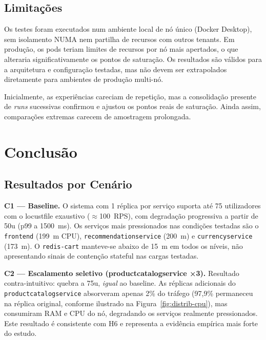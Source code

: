 \documentclass[manuscript,screen,review]{acmart}
\begin{document}
\subsection{Limitações}

Os testes foram executados num ambiente local de nó único (Docker Desktop), sem isolamento NUMA nem partilha de recursos com outros tenants. Em produção, os pods teriam limites de recursos por nó mais apertados, o que alteraria significativamente os pontos de saturação. Os resultados são válidos para a arquitetura e configuração testadas, mas não devem ser extrapolados diretamente para ambientes de produção multi-nó.

Inicialmente, as experiências careciam de repetição, mas a consolidação presente de \textit{runs} sucessivas confirmou e ajustou os pontos reais de saturação. Ainda assim, comparações extremas carecem de amostragem prolongada.

\section{Conclusão}

\subsection{Resultados por Cenário}

\textbf{C1 — Baseline.} O sistema com 1 réplica por serviço suporta até 75 utilizadores com o locustfile exaustivo ($\approx$100~RPS), com degradação progressiva a partir de 50u (p99 a 1500~ms). Os serviços mais pressionados nas condições testadas são o \texttt{frontend} (199~m CPU), \texttt{recommendationservice} (200~m) e \texttt{currencyservice} (173~m). O \texttt{redis-cart} manteve-se abaixo de 15~m em todos os níveis, não apresentando sinais de contenção stateful nas cargas testadas.

\textbf{C2 — Escalamento seletivo (productcatalogservice ×3).} Resultado contra-intuitivo: quebra a 75u, \emph{igual} ao baseline. As réplicas adicionais do \texttt{productcatalogservice} absorveram apenas 2\% do tráfego (97,9\% permaneceu na réplica original, conforme ilustrado na Figura~\ref{fig:distrib-cpu}), mas consumiram RAM e CPU do nó, degradando os serviços realmente pressionados. Este resultado é consistente com H6 e representa a evidência empírica mais forte do estudo.
\end{document}
